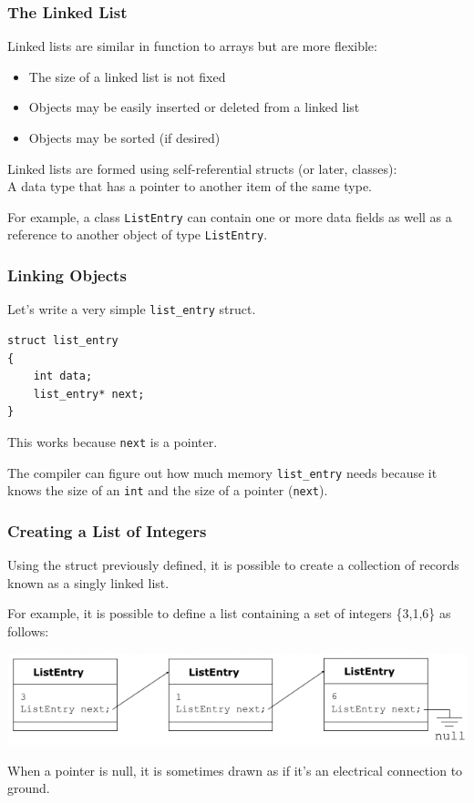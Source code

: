 \begin{frame}
\frametitle{The Linked List}

Linked lists are similar in function to arrays but are more flexible:
\begin{itemize}
    \item The size of a linked list is not fixed
    \item Objects may be easily inserted or deleted from a linked list
    \item Objects may be sorted (if desired)
\end{itemize}

Linked lists are formed using self-referential structs (or later, classes):\\
\quad A data type that has a pointer to another item of the same type.

For example, a class \texttt{ListEntry} can contain one or more data fields as well as a reference to another object of type \texttt{ListEntry}.

\end{frame}


\begin{frame}[fragile]
\frametitle{Linking Objects}

Let's write a very simple \texttt{list\_entry} struct.

\begin{verbatim}
struct list_entry
{
    int data;
    list_entry* next;
}
\end{verbatim}

This works because \texttt{next} is a pointer.

The compiler can figure out how much memory \texttt{list\_entry} needs because it knows the size of an \texttt{int} and the size of a pointer (\texttt{next}).

\end{frame}

\begin{frame}
\frametitle{Creating a List of Integers}

Using the struct previously defined, it is possible to create a collection of records known as a singly linked list.

For example, it is possible to define a list containing a set of integers \{3,1,6\} as follows:

\begin{center}
    \includegraphics[width=\textwidth]{images/list316.png}
\end{center}

When a pointer is null, it is sometimes drawn as if it's an electrical connection to ground.

\end{frame}

